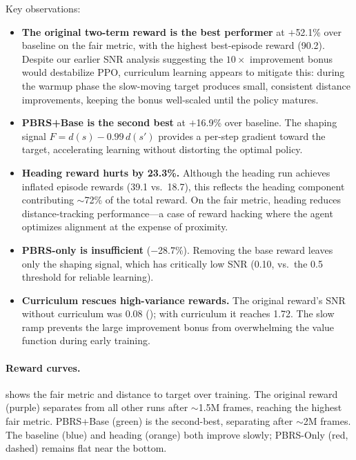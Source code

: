 \documentclass[11pt]{article}
\begin{document}
\noindent
Key observations:

\begin{itemize}
  \item \textbf{The original two-term reward is the best performer} at $+$52.1\% over baseline on the fair metric, with the highest best-episode reward (90.2).
  Despite our earlier SNR analysis suggesting the $10{\times}$ improvement bonus would destabilize PPO, curriculum learning appears to mitigate this: during the warmup phase the slow-moving target produces small, consistent distance improvements, keeping the bonus well-scaled until the policy matures.
  \item \textbf{PBRS+Base is the second best} at $+$16.9\% over baseline.
  The shaping signal $F = d(s) - 0.99\,d(s')$ provides a per-step gradient toward the target, accelerating learning without distorting the optimal policy.
  \item \textbf{Heading reward hurts by 23.3\%.}
  Although the heading run achieves inflated episode rewards (39.1 vs.\ 18.7), this reflects the heading component contributing ${\sim}$72\% of the total reward.
  On the fair metric, heading reduces distance-tracking performance---a case of reward hacking where the agent optimizes alignment at the expense of proximity.
  \item \textbf{PBRS-only is insufficient} ($-$28.7\%).
  Removing the base reward leaves only the shaping signal, which has critically low SNR (0.10, vs.\ the 0.5 threshold for reliable learning).
  \item \textbf{Curriculum rescues high-variance rewards.}
  The original reward's SNR without curriculum was 0.08 (); with curriculum it reaches 1.72.
  The slow ramp prevents the large improvement bonus from overwhelming the value function during early training.
\end{itemize}

\paragraph{Reward curves.}
 shows the fair metric and distance to target over training.
The original reward (purple) separates from all other runs after ${\sim}$1.5M frames, reaching the highest fair metric.
PBRS+Base (green) is the second-best, separating after ${\sim}$2M frames.
The baseline (blue) and heading (orange) both improve slowly; PBRS-Only (red, dashed) remains flat near the bottom.
\end{document}
